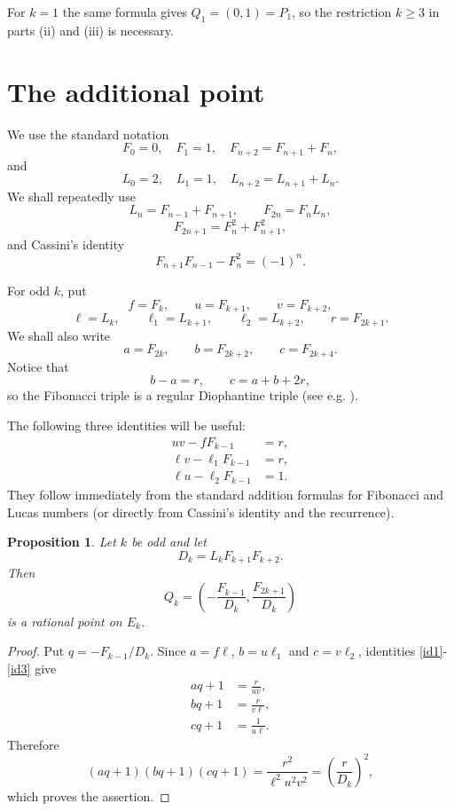 \documentclass[11pt]{amsart}
\newtheorem{proposition}[theorem]{Proposition}
\theoremstyle{remark}
\begin{document}
For $k=1$ the same formula gives $Q_1=(0,1)=P_1$, so the restriction
$k\geq3$ in parts (ii) and (iii) is necessary.

\section{The additional point}

We use the standard notation
\[
 F_0=0,\quad F_1=1,\quad F_{n+2}=F_{n+1}+F_n,
\]
and
\[
 L_0=2,\quad L_1=1,\quad L_{n+2}=L_{n+1}+L_n.
\]
We shall repeatedly use
\[
 L_n=F_{n-1}+F_{n+1},\qquad F_{2n}=F_nL_n,
\]
\[
 F_{2n+1}=F_n^2+F_{n+1}^2,
\]
and Cassini's identity
\[
 F_{n+1}F_{n-1}-F_n^2=(-1)^n.
\]

For odd $k$, put
\[
 f=F_k,\qquad u=F_{k+1},\qquad v=F_{k+2},
\]
\[
 \ell=L_k,\qquad \ell_1=L_{k+1},\qquad \ell_2=L_{k+2},
 \qquad r=F_{2k+1}.
\]
We shall also write
\[
 a=F_{2k},\qquad b=F_{2k+2},\qquad c=F_{2k+4}.
\]
Notice that
\begin{equation}\label{regular}
 b-a=r,\qquad c=a+b+2r,
\end{equation}
so the Fibonacci triple is a regular Diophantine triple (see e.g. \cite[Section 1.1]{DujellaBook}).

The following three identities will be useful:
\begin{align}
 uv-fF_{k-1}&=r,\label{id1}\\
 \ell v-\ell_1F_{k-1}&=r,\label{id2}\\
 \ell u-\ell_2F_{k-1}&=1.\label{id3}
\end{align}
They follow immediately from the standard addition formulas for Fibonacci
and Lucas numbers (or directly from Cassini's identity and the recurrence).

\begin{proposition}\label{Qpoint}
Let $k$ be odd and let
\[
 D_k=L_kF_{k+1}F_{k+2}.
\]
Then
\[
 Q_k=\left(-\frac{F_{k-1}}{D_k},
           \frac{F_{2k+1}}{D_k}\right)
\]
is a rational point on $E_k$.
\end{proposition}

\begin{proof}
Put $q=-F_{k-1}/D_k$.  Since $a=f\ell$, $b=u\ell_1$ and
$c=v\ell_2$, identities \eqref{id1}-\eqref{id3} give
\begin{align}
 aq+1&=\frac{r}{uv},\label{Q1}\\
 bq+1&=\frac{r}{v\ell},\label{Q2}\\
 cq+1&=\frac{1}{u\ell}.\label{Q3}
\end{align}
Therefore
\[
 (aq+1)(bq+1)(cq+1)
 =\frac{r^2}{\ell^2u^2v^2}
 =\left(\frac{r}{D_k}\right)^2,
\]
which proves the assertion.
\end{proof}
\end{document}
